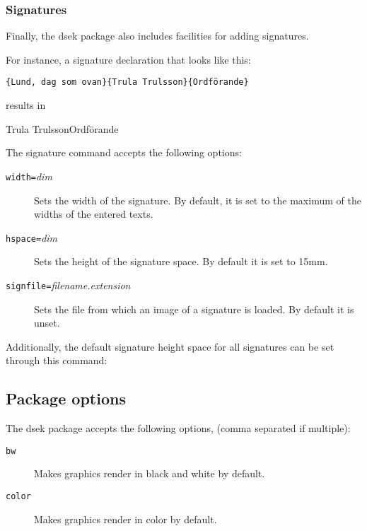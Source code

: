 \documentclass[a4paper, oneside]{ltxdoc}
\begin{document}
\subsubsection{Signatures}
Finally, the \textsf{dsek} package also includes facilities for adding
signatures.

\begin{center}
\end{center}

For instance, a signature declaration that looks like this:

\begin{center}
  \texttt{\{Lund, dag som ovan\}\{Trula Trulsson\}\{Ordförande\}}
\end{center}

results in

\begin{center}
  \signature{Lund, dag som ovan}{Trula Trulsson}{Ordförande}
\end{center}

The signature command accepts the following options:
\begin{description}
  \item[\texttt{width=}\textlangle\textit{dim}\textrangle] Sets the width of the
        signature.  By default, it is set to the maximum of the widths of the
        entered texts.
  \item[\texttt{hspace=}\textlangle\textit{dim}\textrangle] Sets the height of
        the signature space.  By default it is set to 15mm.
  \item[\texttt{signfile=}\textlangle\textit{filename.extension}\textrangle] Sets the file
        from which an image of a signature is loaded. By default it is unset.
\end{description}

Additionally, the default signature height space for all signatures can be set
through this command:
\begin{center}
\end{center}

\subsection{Package options}
The \textsf{dsek} package accepts the following options, (comma separated if
multiple):

\begin{description}
  \item[\texttt{bw}] Makes graphics render in black and white by default.
  \item[\texttt{color}] Makes graphics render in color by default.
\end{description}
\end{document}
